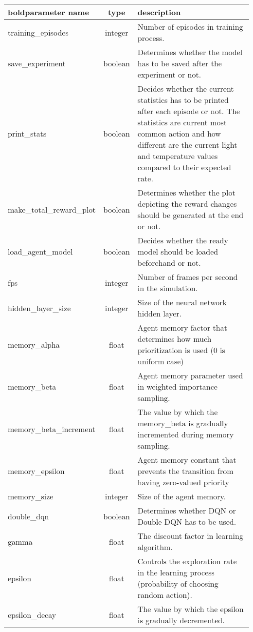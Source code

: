 \documentclass{article}
\begin{document}
\begin{longtable}{l|c|p{9cm}}
	\hline
	{bold}parameter name & type & description \\
	\hline
    training\_episodes & integer & Number of episodes in training process.\\
    \hline
    save\_experiment & boolean & Determines whether the model has to be saved after the experiment or not.\\
    \hline
    print\_stats & boolean & Decides whether the current statistics has to be printed after each episode or not. The statistics are current most common action and how different are the current light and temperature values compared to their expected rate.\\
    \hline
    make\_total\_reward\_plot & boolean & Determines whether the plot depicting the reward changes should be generated at the end or not.\\
    \hline
    load\_agent\_model & boolean & Decides whether the ready model should be loaded beforehand or not.\\
    \hline
    fps & integer & Number of frames per second in the simulation.\\
    \hline
    hidden\_layer\_size & integer & Size of the neural network hidden layer.\\
    \hline
    memory\_alpha & float & Agent memory factor that determines how much prioritization is used (0 is uniform case)\\
    \hline
    memory\_beta & float & Agent memory parameter used in weighted importance sampling.\\
    \hline
    memory\_beta\_increment & float & The value by which the memory\_beta is gradually incremented during memory sampling.\\
    \hline
    memory\_epsilon & float & Agent memory constant that prevents the transition from having zero-valued priority\\
    \hline
    memory\_size & integer & Size of the agent memory.\\
    \hline
    double\_dqn & boolean & Determines whether DQN or Double DQN has to be used.\\
    \hline
    gamma & float & The discount factor in learning algorithm.\\
    \hline
    epsilon & float & Controls the exploration rate in the learning process (probability of choosing random action).\\
    \hline
    epsilon\_decay & float & The value by which the epsilon is gradually decremented.\\

\end{longtable}
\end{document}
